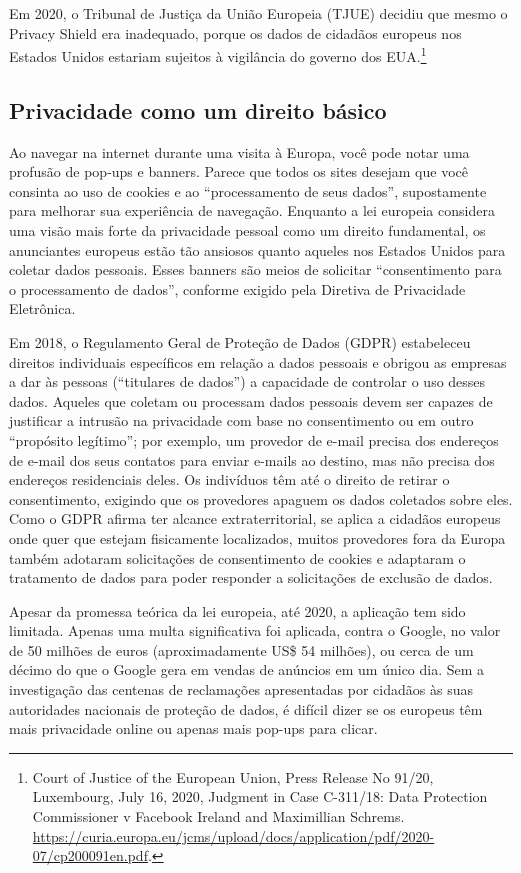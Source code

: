 \documentclass{book}
\begin{document}
Em 2020, o Tribunal de Justiça da União Europeia (TJUE) decidiu que mesmo o
Privacy Shield era inadequado, porque os dados de cidadãos europeus nos Estados
Unidos estariam sujeitos à vigilância do governo dos EUA.\footnote{Court of
Justice of the European Union, Press Release No 91/20, Luxembourg, July 16,
2020, Judgment in Case C-311/18: Data Protection Commissioner v Facebook
Ireland and Maximillian Schrems.
\url{https://curia.europa.eu/jcms/upload/docs/application/pdf/2020-07/cp200091en.pdf}.}

\subsection{Privacidade como um direito básico}
\label{cap3:quem-principios-basico}
Ao navegar na internet durante uma visita à Europa, você pode notar uma profusão
de pop-ups e banners. Parece que todos os sites desejam que você consinta ao uso
de cookies e ao ``processamento de seus dados'', supostamente para melhorar sua
experiência de navegação. Enquanto a lei europeia considera uma visão mais forte
da privacidade pessoal como um direito fundamental, os anunciantes europeus estão
tão ansiosos quanto aqueles nos Estados Unidos para coletar dados pessoais. Esses
banners são meios de solicitar ``consentimento para o processamento de dados'',
conforme exigido pela Diretiva de Privacidade Eletrônica.

Em 2018, o Regulamento Geral de Proteção de Dados (GDPR) estabeleceu direitos
individuais específicos em relação a dados pessoais e obrigou as empresas a dar
às pessoas (``titulares de dados'') a capacidade de controlar o uso desses
dados. Aqueles que coletam ou processam dados pessoais devem ser capazes de
justificar a intrusão na privacidade com base no consentimento ou em outro
``propósito legítimo''; por exemplo, um provedor de e-mail precisa dos
endereços de e-mail dos seus contatos para enviar e-mails ao destino, mas não
precisa dos endereços residenciais deles. Os indivíduos têm até o direito de
retirar o consentimento, exigindo que os provedores apaguem os dados coletados
sobre eles. Como o GDPR afirma ter alcance extraterritorial, se aplica a
cidadãos europeus onde quer que estejam fisicamente localizados, muitos
provedores fora da Europa também adotaram solicitações de consentimento de
cookies e adaptaram o tratamento de dados para poder responder a solicitações
de exclusão de dados.

Apesar da promessa teórica da lei europeia, até 2020, a aplicação tem sido
limitada. Apenas uma multa significativa foi aplicada, contra o Google, no
valor de 50 milhões de euros (aproximadamente US\$ 54 milhões), ou cerca de um
décimo do que o Google gera em vendas de anúncios em um único dia. Sem a
investigação das centenas de reclamações apresentadas por cidadãos às suas
autoridades nacionais de proteção de dados, é difícil dizer se os europeus têm
mais privacidade online ou apenas mais pop-ups para clicar.
\end{document}
